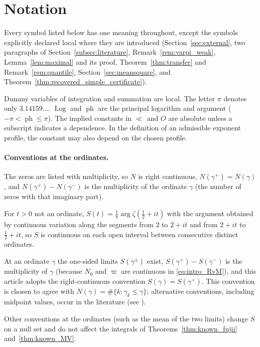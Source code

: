 \documentclass[11pt,a4paper]{article}
\makeatletter
\numberwithin{equation}{section}
\DeclareRobustCommand{\CGref}[1]{\ref{#1}}
\DeclareRobustCommand{\CGeqref}[1]{\eqref{#1}}
\DeclareRobustCommand{\CGcite}[2][]{\if\relax\detokenize{#1}\relax\cite{#2}\else\cite[#1]{#2}\fi}
\let\CG@origref\ref
\let\CG@origeqref\eqref
\newcommand{\CG@gettip}[1]{\@ifundefined{CGTip@#1}{#1}{\csname CGTip@#1\endcsname}}
\newcommand{\CG@getbib}[1]{\@ifundefined{CGBib@#1}{#1}{\csname CGBib@#1\endcsname}}
\DeclareRobustCommand{\CGref}[1]{\pdftooltip{\CG@origref{#1}}{\CG@gettip{#1}}}
\DeclareRobustCommand{\CGeqref}[1]{\pdftooltip{\CG@origeqref{#1}}{\CG@gettip{#1}}}
\DeclareRobustCommand{\CGcite}[2][]{\pdftooltip{\if\relax\detokenize{#1}\relax\cite{#2}\else\cite[#1]{#2}\fi}{\CG@getbib{#2}}}
\theoremstyle{definition}
\theoremstyle{remark}
\newcommand{\Nz}{N_0} %
\makeatother
\begin{document}
\section{Notation}\label{sec:notation}

Every symbol listed below has one meaning throughout, except the symbols explicitly declared local where they are introduced (Section~\CGref{sec:external}, two paragraphs of Section~\CGref{subsec:literature}, Remark~\CGref{rem:varpi_weak}, Lemma~\CGref{lem:maximal} and its proof, Theorem~\CGref{thm:transfer} and Remark~\CGref{rem:quantile}, Section~\CGref{sec:meansquare}, and Theorem~\CGref{thm:recovered_simple_certificate}).

Dummy variables of integration and summation are local. The letter $\pi$ denotes only $3.14159\ldots$. $\operatorname{Log}$ and $\operatorname{ph}$ are the principal logarithm and argument ($-\pi<\operatorname{ph}\le\pi$). The implied constants in $\ll$ and $O$ are absolute unless a subscript indicates a dependence. In the definition of an admissible exponent profile, the constant may also depend on the chosen profile.

\paragraph{Conventions at the ordinates.}
The zeros are listed with multiplicity, so $N$ is right continuous, $N(\gamma^+)=N(\gamma)$, and $N(\gamma^+)-N(\gamma^-)$ is the multiplicity of the ordinate $\gamma$ (the number of zeros with that imaginary part).

For $t>0$ not an ordinate, $S(t)=\frac1\pi\arg\zeta(\frac12+it)$ with the argument obtained by continuous variation along the segments from $2$ to $2+it$ and from $2+it$ to $\frac12+it$, so $S$ is continuous on each open interval between consecutive distinct ordinates.

At an ordinate $\gamma$ the one-sided limits $S(\gamma^\pm)$ exist, $S(\gamma^+)-S(\gamma^-)$ is the multiplicity of $\gamma$ (because $\Nz$ and $\varpi$ are continuous in \CGeqref{eq:intro_RvM}), and this article adopts the right-continuous convention $S(\gamma)=S(\gamma^+)$. This convention is chosen to agree with $N(\gamma)=\#\{k:\gamma_k\le\gamma\}$; alternative conventions, including midpoint values, occur in the literature (see \CGcite[\S9.3]{Titchmarsh1986}).

Other conventions at the ordinates (such as the mean of the two limits) change $S$ on a null set and do not affect the integrals of Theorems~\CGref{thm:known_fujii} and~\CGref{thm:known_MV}.
\end{document}
